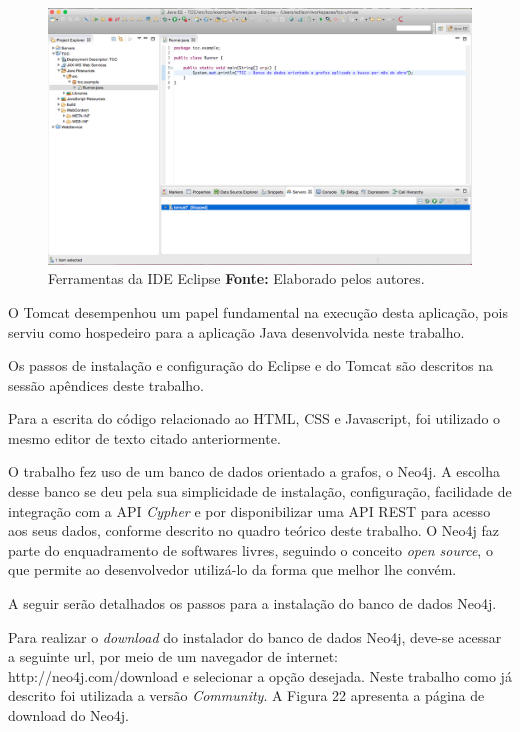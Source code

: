 \newpage
\begin{figure}[h!]
	\centerline{\includegraphics[scale=0.35]{./imagens/eclipse-editor-texto.png}}
	\caption[Ferramentas da IDE Eclipse]
	{Ferramentas da IDE Eclipse \textbf{Fonte:} Elaborado pelos autores.}
	\label{fig:exemplo1}
\end{figure}

\par O Tomcat desempenhou um papel fundamental na execução desta aplicação, pois serviu como hospedeiro para a aplicação Java desenvolvida neste trabalho. 

\par Os passos de instalação e configuração do Eclipse e do Tomcat são descritos na sessão apêndices deste trabalho.

\par Para a escrita do código relacionado ao HTML, CSS e Javascript, foi utilizado o mesmo editor de texto citado anteriormente.

\par O trabalho fez uso de um banco de dados orientado a grafos, o Neo4j. A escolha desse banco se deu pela sua simplicidade de instalação, configuração, facilidade de integração com a API \textit{Cypher} e por disponibilizar uma API REST para acesso aos seus dados, conforme descrito no quadro teórico deste trabalho. O Neo4j faz parte do enquadramento de softwares livres, seguindo o conceito \textit{open source}, o que permite ao desenvolvedor utilizá-lo da forma que melhor lhe convém. 


\par A seguir serão detalhados os passos para a instalação do banco de dados Neo4j.

\par Para realizar o \textit{download} do instalador do banco de dados Neo4j, deve-se acessar a seguinte url, por meio de um  navegador de internet: http://neo4j.com/download e selecionar a opção desejada. Neste trabalho como já descrito foi utilizada a versão \textit{Community}. A Figura 22 apresenta a página de download do Neo4j.

